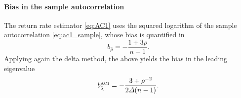 \documentclass[openacc]{rsproca_new}
\begin{document}
\paragraph{Bias in the sample autocorrelation}
The return rate estimator \eqref{eq:AC1} uses the squared logarithm of the sample autocorrelation \eqref{eq:ac1_sample}, whose bias is quantified in \cite[Eq.~$(21)$]{Kendall1954}
%
\begin{equation*}
  b_{\hat\rho} = - \frac{1 + 3\rho}{n-1} .
\end{equation*}
%
Applying again the delta method, the above yields the bias in the leading eigenvalue \cite[Eq.~$(12)$]{Yu2012}
%
\begin{equation}\label{eq:AC1_bias}
  b_{\hat\lambda}^{\text{\tiny AC1}} = - \frac{3 + \rho^{-2}}{2\Delta(n-1)} .
\end{equation}
%
\end{document}
